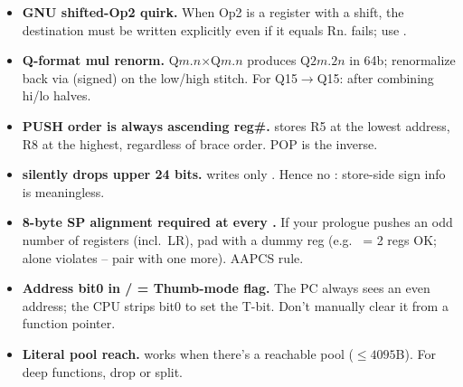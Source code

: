 \begin{itemize}
\item \textbf{GNU shifted-Op2 quirk.} When Op2 is a register with a shift, the destination must be written explicitly even if it equals Rn.  fails; use .
\item \textbf{Q-format mul renorm.} Q$m.n$$\times$Q$m.n$ produces Q$2m.2n$ in 64b; renormalize back via  (signed) on the low/high stitch. For Q15$\to$Q15:  after combining hi/lo halves.
\item \textbf{PUSH order is always ascending reg\#.}  stores R5 at the lowest address, R8 at the highest, regardless of brace order. POP is the inverse.
\item \textbf{ silently drops upper 24 bits.}  writes only . Hence no : store-side sign info is meaningless.
\item \textbf{8-byte SP alignment required at every .} If your prologue pushes an odd number of registers (incl.\ LR), pad with a dummy reg (e.g.\  = 2 regs OK;  alone violates -- pair with one more). AAPCS rule.
\item \textbf{Address bit0 in / = Thumb-mode flag.} The PC always sees an even address; the CPU strips bit0 to set the T-bit. Don't manually clear it from a function pointer.
\item \textbf{Literal pool reach.}  works when there's a reachable pool ($\le 4095$B). For deep functions, drop  or split.
\end{itemize}

